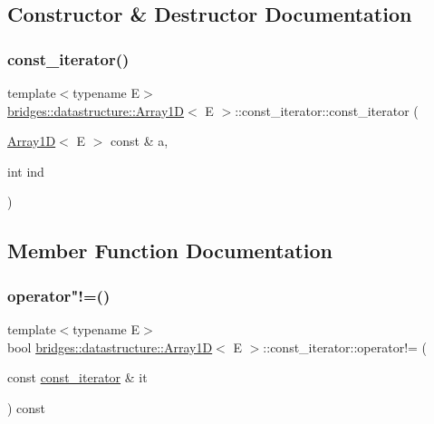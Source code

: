 \subsection{Constructor \& Destructor Documentation}
\mbox{\label{classbridges_1_1datastructure_1_1_array1_d_1_1const__iterator_a1ea421b46a3f0907190a91752e1f5b32}} 
\subsubsection{\texorpdfstring{const\+\_\+iterator()}{const\_iterator()}}
{\footnotesize\ttfamily template$<$typename E$>$ \\
\mbox{\hyperlink{classbridges_1_1datastructure_1_1_array1_d}{bridges\+::datastructure\+::\+Array1D}}$<$ E $>$\+::const\+\_\+iterator\+::const\+\_\+iterator (\begin{DoxyParamCaption}\item[{\mbox{\hyperlink{classbridges_1_1datastructure_1_1_array1_d}{Array1D}}$<$ E $>$ const \&}]{a,  }\item[{int}]{ind }\end{DoxyParamCaption})\hspace{0.3cm}{\ttfamily [inline]}}



\subsection{Member Function Documentation}
\mbox{\label{classbridges_1_1datastructure_1_1_array1_d_1_1const__iterator_ada463ec150271769b2a9e34c9bebdd05}} 
\subsubsection{\texorpdfstring{operator"!=()}{operator!=()}}
{\footnotesize\ttfamily template$<$typename E$>$ \\
bool \mbox{\hyperlink{classbridges_1_1datastructure_1_1_array1_d}{bridges\+::datastructure\+::\+Array1D}}$<$ E $>$\+::const\+\_\+iterator\+::operator!= (\begin{DoxyParamCaption}\item[{const \mbox{\hyperlink{classbridges_1_1datastructure_1_1_array1_d_1_1const__iterator}{const\+\_\+iterator}} \&}]{it }\end{DoxyParamCaption}) const\hspace{0.3cm}{\ttfamily [inline]}}

